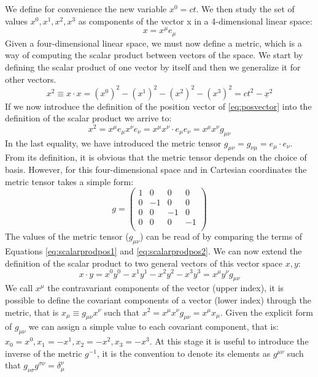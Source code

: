 \vspace{2mm}\noindent We define for convenience the new variable $x^0 = ct$. We then study the set of values $x^0,x^1,x^2,x^3$ as components of the vector x in a 4-dimensional linear space:
\begin{equation}
    x = x^\mu e_\mu
    \label{eq:posvector}
\end{equation}
Given a four-dimensional linear space, we must now define a metric, which is a way of computing the scalar product between vectors of the space. We start by defining the scalar product of one vector by itself and then we generalize it for other vectors.
\begin{equation}
    x^2 \equiv x\cdot x = (x^0)^2-(x^1)^2-(x^2)^2-(x^3)^2 = ct^2 - \underline x^2
    \label{eq:scalarprodpos1}
\end{equation}
If we now introduce the definition of the position vector of \ref{eq:posvector} into the definition of the scalar product we arrive to:
\begin{equation}
x^2 =  x^\mu e_\mu  x^\nu e_\nu =  x^\mu x^\nu  \cdot e_\mu  e_\nu = x^\mu x^\nu g_{\mu\nu}
\label{eq:scalarprodpos2}
\end{equation}
In the last equality, we have introduced the metric tensor $g_{\mu\nu} = g_{\nu\mu} = e_\mu \cdot e_\nu $. From its definition, it is obvious that the metric tensor depends on the choice of basis. However, for this four-dimensional space and in Cartesian coordinates the metric tensor takes a simple form:
\begin{equation}
    g = \begin{pmatrix}
1 & 0 & 0 & 0\\
0 & -1 & 0 & 0\\
0 & 0 & -1 & 0\\
0 & 0 & 0 & -1\\
\end{pmatrix}
\end{equation}
The values of the metric tensor ($g_{\mu\nu}$) can be read of by comparing the terms of Equations \ref{eq:scalarprodpos1} and \ref{eq:scalarprodpos2}. We can now extend the definition of the scalar product to two general vectors of this vector space $x,y$:
\begin{equation}
    x\cdot y = x^0y^0-x^1y^1-x^2y^2-x^3y^3 = x^\mu y^\nu g_{\mu\nu} 
\end{equation}
We call $x^\mu$ the contravariant components of the vector (upper index), it is possible to define the covariant components of a vector (lower index) through the metric, that is $x_\mu \equiv g_{\mu\nu}x^\nu$ such that $x^2 =  x^\mu x^\nu g_{\mu\nu} = x^\mu x_\mu$. Given the explicit form of $g_{\mu\nu}$ we can assign a simple value to each covariant component, that is: $x_0 = x^0, x_1 = -x^1, x_2 = -x^2, x_3 = - x^3$. At this stage it is useful to introduce the inverse of the metric $g^{-1}$, it is the convention to denote its elements as $g^{\mu \nu}$ such that $g_{\nu\sigma}g^{\sigma \nu} = \delta^\nu_\mu$

